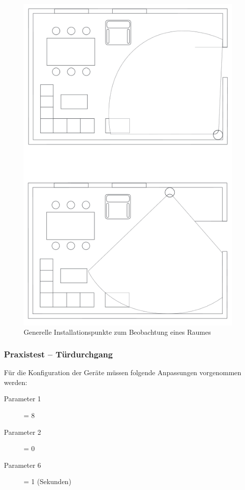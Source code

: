 \begin{figure}[h!]
	\centering
	\includegraphics[scale=0.4]{img/Sensorevaluation/FibaroMultiExamples.png}
	\caption{Generelle Installationspunkte zum Beobachtung eines Raumes}
	\label{fig:sensorenFibaroMultiExamples}
\end{figure}

\subsubsection{Praxistest – Türdurchgang}
Für die Konfiguration der Geräte müssen folgende Anpassungen vorgenommen werden:
\begin{description}
	\item [Parameter 1] = 8
	\item [Parameter 2] = 0
	\item [Parameter 6] = 1 (Sekunden)
	
\end{description}

